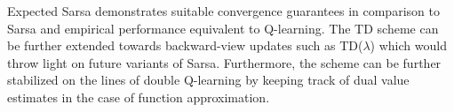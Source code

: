 \documentclass[11pt,letterpaper]{article}
\begin{document}
Expected Sarsa demonstrates suitable convergence guarantees in comparison to Sarsa and empirical performance equivalent to Q-learning. The TD scheme can be further extended towards backward-view updates such as TD($\lambda$) which would throw light on future variants of Sarsa. Furthermore, the scheme can be further stabilized on the lines of double Q-learning by keeping track of dual value estimates in the case of function approximation. 
\end{document}
